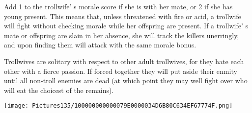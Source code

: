 \documentclass[a4paper,twoside,openany,10pt]{book}
\begin{document}
\begin{multicols}{2}
Add 1 to the trollwife' s morale score if she is with her mate, or 2 if she has young present. This means that, unless threatened with fire or acid, a trollwife will fight without checking morale while her offspring are present. If a trollwife' s mate or offspring are slain in her absence, she will track the killers unerringly, and upon finding them will attack with the same morale bonus.

Trollwives are solitary with respect to other adult trollwives, for they hate each other with a fierce passion. If forced together they will put aside their enmity until all non-troll enemies are dead (at which point they may well fight over who will eat the choicest of the remains). 

\end{multicols}

\begin{center} \texttt{[image: Pictures135/100000000000079E0000034D6B80C634EF67774F.png]} \end{center}
\end{document}

